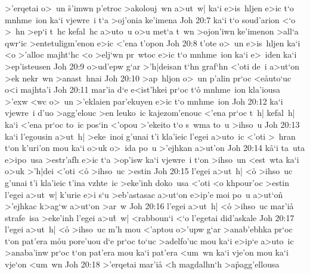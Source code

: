 >'erqetai
o>~un
\r{s}'imwn
p'etroc
>akolouj~wn
a>ut~w|
ka`i
e>is~hljen
e>ic
t`o
mnhme~ion
ka`i
vjewre~i
t`a
>oj'onia
ke'imena\bibvsend
\vs Joh 20:7
ka`i
t`o
soud'arion
<`o
>~hn
>ep`i
t~hc
kefal~hc
a>uto~u
o>u
met`a
t~wn
>ojon'iwn
ke'imenon
>all`a
qwr`ic
>entetuligm'enon
e>ic
<'ena
t'opon\bibvsend
\vs Joh 20:8
t'ote
o>~un
e>is~hljen
ka`i
<o
>'alloc
majht`hc
<o
>elj`wn
pr~wtoc
e>ic
t`o
mnhme~ion
ka`i
e>~iden
ka`i
>ep'isteusen\bibvsend
\vs Joh 20:9
o>ud'epw
g`ar
>'h|deisan
t`hn
graf`hn
<'oti
de~i
a>ut`on
>ek
nekr~wn
>anast~hnai\bibvsend
\vs Joh 20:10
>ap~hljon
o>~un
p'alin
pr`oc
<e\r{a}uto`uc
o<i
majhta'i\bibvsend
\vs Joh 20:11
mar'ia
d`e
e<ist'hkei
pr`oc
t`o\r{}
mnhme~ion
kla'iousa
>'exw
<wc
o>~un
>'eklaien
par'ekuyen
e>ic
t`o
mnhme~ion\bibvsend
\vs Joh 20:12
ka`i
vjewre~i
d'uo
>agg'elouc
>en
leuko~ic
kajezom'enouc
<'ena
pr`oc
t~h|
kefal~h|
ka`i
<'ena
pr`oc
to~ic
pos`in
<'opou
>'ekeito
t`o
s~wma
to~u
>ihso~u\bibvsend
\vs Joh 20:13
ka`i
l'egousin
a>ut~h|
>eke~inoi
g'unai
t'i
kla'ieic
l'egei
a>uto~ic
<'oti
>~hran
t`on
k'uri'on
mou
ka`i
o>uk
o>~ida
po~u
>'ejhkan
a>ut'on\bibvsend
\vs Joh 20:14
k\r{a}`i
ta~uta
e>ipo~usa
>estr'afh
e>ic
t`a
>op'isw
ka`i
vjewre~i
t`on
>ihso~un
<est~wta
ka`i
o>uk
>'h|dei
<'oti
<o\r{}
>ihso~uc
>estin\bibvsend
\vs Joh 20:15
l'egei
a>ut~h|
<o\r{}
>ihso~uc
g'unai
t'i
kla'ieic
t'ina
vzhte~ic
>eke'inh
doko~usa
<'oti
<o
khpour'oc
>estin
l'egei
a>ut~w|
k'urie
e>i
s`u
>eb'astasac
a>ut`on
e>ip'e
moi
po~u
a>ut`on\r{}
>'ejhkac
k>ag`w
a>ut`on
>ar~w\bibvsend
\vs Joh 20:16
l'egei
a>ut~h|
<o\r{}
>ihso~uc
mar'i\r{a}
strafe~isa
>eke'inh
l'egei
a>u\r{t}~w|
<rabboun`i
<`o
l'egetai
did'askale\bibvsend
\vs Joh 20:17
l'egei
a>ut~h|
<o\r{}
>ihso~uc
m'h
mou
<'aptou
o>'upw
g`ar
>anab'ebhka
pr`oc
t`on
pat'era
m\r{o}u
pore'uou
d`e
pr`oc
to`uc
>adelfo'uc
mou
ka`i
e>ip`e
a>uto~ic
>anaba'inw
pr`oc
t`on
pat'era
mou
ka`i
pat'era
<um~wn
ka`i
vje'on
mou
ka`i
vje`on
<um~wn\bibvsend
\vs Joh 20:18
>'erqetai
mar'i\r{a}
<h
magdalhn`h
>a\r{p}agg'ellousa
